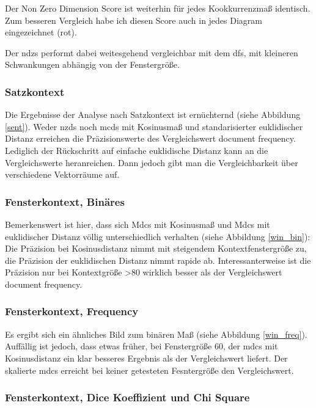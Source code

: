 \documentclass[11pt,numbers=noenddot]{scrartcl}
\begin{document}
Der Non Zero Dimension Score ist weiterhin für jedes Kookkurrenzmaß identisch. Zum besseren Vergleich habe ich diesen Score auch in jedes Diagram eingezeichnet (rot).

Der ndzs performt dabei weitesgehend vergleichbar mit dem dfs, mit kleineren Schwankungen abhängig von der Fenstergröße.

\subsubsection {Satzkontext}

Die Ergebnisse der Analyse nach Satzkontext ist ernüchternd (siehe Abbildung \ref{sent}). Weder nzds noch mcds mit Kosinusmaß und standarisierter euklidischer Distanz erreichen die Präzisionswerte des Vergleichswert document frequency. Lediglich der Rückschritt auf einfache euklidische Distanz kann an die Vergleichswerte heranreichen. Dann jedoch gibt man die Vergleichbarkeit über verschiedene Vektorräume auf.


\subsubsection{Fensterkontext, Binäres}

Bemerkenswert ist hier, dass sich Mdcs mit Kosinusmaß und Mdcs mit euklidischer Distanz völlig unterschiedlich verhalten (siehe Abbildung \ref{win_bin}): Die Präzision bei Kosinusdistanz nimmt mit steigendem Kontextfenstergröße zu, die Präzision der euklidischen Distanz nimmt rapide ab. Interessanterweise ist die Präzision nur bei Kontextgröße >80 wirklich besser als der Vergleichswert document frequency.


\subsubsection{Fensterkontext, Frequency}

Es ergibt sich ein ähnliches Bild zum binären Maß (siehe Abbildung \ref{win_freq}). Auffällig ist jedoch, dass etwas früher, bei Fenstergröße 60, der mdcs mit Kosinusdistanz ein klar besseres Ergebnis als der Vergleichswert liefert. Der skalierte mdcs erreicht bei keiner getesteten Fesntergröße den Vergleichswert.


\subsubsection{Fensterkontext, Dice Koeffizient und Chi Square}
\end{document}
